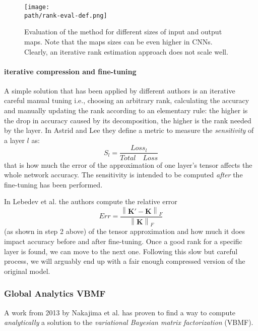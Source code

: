 \begin{figure}[h!]
 \centering
 \texttt{[image: \\path/rank-eval-def.png]} 
 \caption{Evaluation of the  method for different sizes of input and output maps. Note that the maps sizes can be even higher in CNNs. Clearly, an iterative rank estimation approach does not scale well.}
 \label{fig:rankest}
\end{figure}


\newline 
\paragraph{iterative compression and fine-tuning}
A simple solution that has been applied by different authors is an iterative careful manual tuning \parencite{astrid2017} \parencite{lebedev2014} i.e., choosing an arbitrary rank, calculating the accuracy and manually updating the rank according to an elementary rule: the higher is the drop in accuracy caused by its decomposition, the higher is the rank needed by the layer.
\newline 
In Astrid and Lee \parencite{astrid2017} they define a metric to measure the \emph{sensitivity} of a layer $l$ as:
\begin{equation}
	S_{l} = \frac{Loss_l}{Total \quad Loss}
\end{equation}
that is how much the error of the approximation of one layer's tensor affects the whole network accuracy. The sensitivity is intended to be computed \emph{after} the fine-tuning has been performed. 
\newline 

In Lebedev et al. \parencite{lebedev2014} the authors compute the relative error $$ Err = \frac{\left \| \mathbf{K'} - \mathbf{K}  \right \|_{F}}{\left \| \mathbf{K} \right \|_{F}}$$ (as shown in step 2 above) of the tensor approximation and how much it does impact accuracy before and after fine-tuning.  
Once a good rank for a specific layer is found, we can move to the next one. Following this slow but careful process, we will arguably end up with a fair enough compressed version of the original model. 

\subsubsection{Global Analytics VBMF}
A work from 2013 by Nakajima et al. \parencite{nakajima2013} has proven to find a way to compute \emph{analytically} a solution to the \emph{variational Bayesian matrix factorization} (VBMF). 

